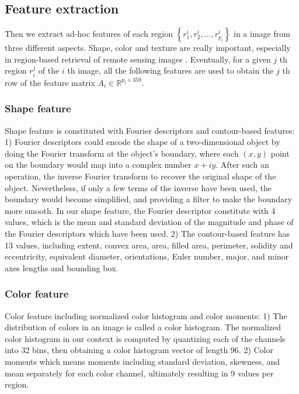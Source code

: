 \documentclass[11pt]{article}
\begin{document}
\subsection{Feature extraction}
Then we extract ad-hoc features of each region $\left\{r_1^i,r_2^i,\dots,r_{p_i}^i\right\}$ in a image from three different aspects. Shape, color and texture are really important, especially in region-based retrieval of remote sensing images \cite{chaudhuri2016region}. Eventually, for a given $j$ th region $r_i^j$ of the $i$ th image, all the following features are used to obtain the $j$ th row of the feature matrix $A_i\in\mathbb{R}^{p_i\times 359}$.

\subsubsection{Shape feature}
Shape feature is constituted with Fourier descriptors \cite{Lowe1999Object} and contour-based features: 1) Fourier descriptors could encode the shape of a two-dimensional object by doing the Fourier transform at the object's boundary, where each $(x,y)$ point on the boundary would map into a complex number $x+iy$. After such an operation, the inverse Fourier transform to recover the original shape of the object. Nevertheless, if only a few terms of the inverse have been used, the boundary would become simplified, and providing a filter to make the boundary more smooth. In our shape feature, the Fourier descriptor constitute with 4 values, which is the mean and standard deviation of the magnitude and phase of the Fourier descriptors which have been used. 2) The contour-based feature has 13 values, including extent, convex area, area, filled area, perimeter, solidity and eccentricity, equivalent diameter,  orientations, Euler number, major, and minor axes lengths and bounding box. 

\subsubsection{Color feature}
Color feature including normalized color histogram and color moments: 1) The distribution of colors in an image is called a color histogram. The normalized color histogram in our context is computed by quantizing each of the channels into 32 bins, then obtaining a color histogram vector of length 96. 2) Color moments which means moments including standard deviation, skewness, and mean separately for each color channel, ultimately resulting in 9 values per region.
\end{document}
